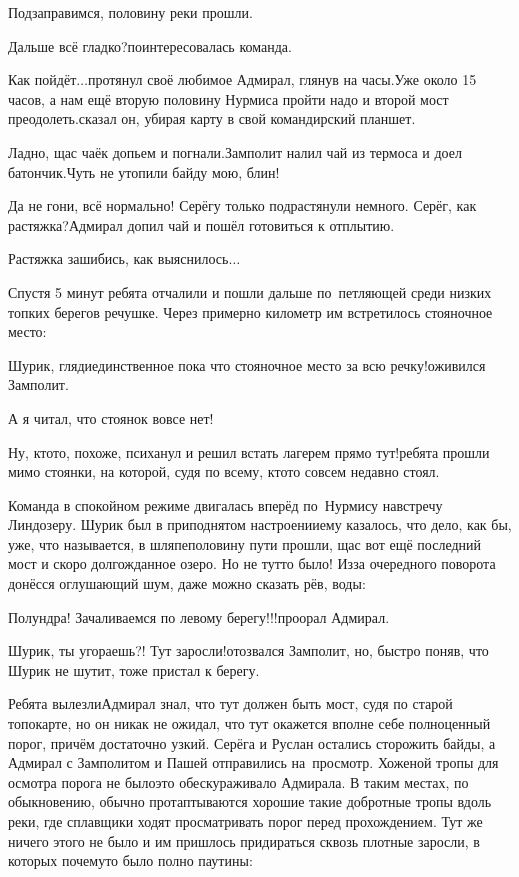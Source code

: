 \diagdash Подзаправимся, половину реки прошли.

\diagdash Дальше всё гладко?\mdash поинтересовалась команда.

\renewcommand*{\thefootnote}{\fnsymbol{footnote}}
\setcounter{footnote}{0}
\diagdash Как пойдёт$\ldots$\mdash протянул своё любимое Адмирал, глянув на часы.\mdash Уже около 15 часов, а нам ещё вторую половину Нурмиса пройти надо и второй мост преодолеть.\mdash сказал он, убирая карту в свой командирский планшет.

\diagdash Ладно, щас чаёк допьем и погнали.\mdash Замполит налил чай из термоса и доел батончик.\mdash Чуть не утопили байду мою, блин!

\diagdash Да не гони, всё нормально! Серёгу только подрастянули немного. Серёг, как растяжка?\mdash Адмирал допил чай и пошёл готовиться к отплытию.

\diagdash Растяжка зашибись, как выяснилось$\ldots$

Спустя 5 минут ребята отчалили и пошли дальше по~петляющей среди низких топких берегов речушке. Через примерно километр им встретилось стояночное место:

\diagdash Шурик, гляди\mdash единственное пока что стояночное место за всю речку!\mdash оживился Замполит.

\diagdash А я читал, что стоянок вовсе нет!

\diagdash Ну, кто\sdash то, похоже, психанул и решил встать лагерем прямо тут!\mdash ребята прошли мимо стоянки, на которой, судя по всему, кто\sdash то совсем недавно стоял.

Команда в спокойном режиме двигалась вперёд по~Нурмису навстречу Линдозеру. Шурик был в приподнятом настроении\mdash ему казалось, что дело, как бы, уже, что называется, в шляпе\mdash половину пути прошли, щас вот ещё последний мост и скоро долгожданное озеро. Но не тут\sdash то было! Из\sdash за очередного поворота донёсся оглушающий шум, даже можно сказать рёв, воды:

\diagdash Полундра! Зачаливаемся по левому берегу!!!\mdash проорал Адмирал.

\diagdash Шурик, ты угораешь?! Тут заросли!\mdash отозвался Замполит, но, быстро поняв, что Шурик не шутит, тоже пристал к берегу.

Ребята вылезли\mdash Адмирал знал, что тут должен быть мост, судя по старой топокарте, но он никак не ожидал, что тут окажется вполне себе полноценный порог, причём достаточно узкий. Серёга и Руслан остались сторожить байды, а Адмирал с Замполитом и Пашей отправились на~просмотр. Хоженой тропы для осмотра порога не было\mdash это обескураживало Адмирала. В таким местах, по обыкновению, обычно протаптываются хорошие такие добротные тропы вдоль реки, где сплавщики ходят просматривать порог перед прохождением. Тут же ничего этого не было и им пришлось придираться сквозь плотные заросли, в которых почему\sdash то было полно паутины:

